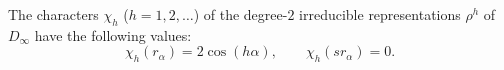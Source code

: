 The characters $\chi_{h}$ ($h = 1, 2, \ldots$) of the degree-$2$ irreducible representations $\rho^{h}$ of $D_{\infty}$ have the following values:
$$
\chi_{h}(r_{\alpha}) = 2 \cos(h \alpha), \qquad \chi_{h}(s r_{\alpha}) = 0.
$$
